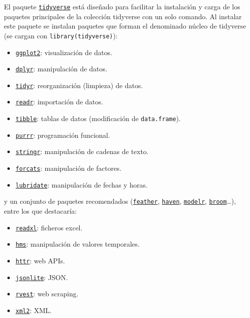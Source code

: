 \documentclass[
]{book}
\providecommand{\tightlist}{%
  \setlength{\itemsep}{0pt}\setlength{\parskip}{0pt}}
\theoremstyle{break}
\theoremstyle{nonumberplain}
\begin{document}
El paquete \href{https://tidyverse.tidyverse.org}{\texttt{tidyverse}} está diseñado para facilitar la instalación y carga de los paquetes principales de la colección tidyverse con un solo comando.
Al instalar este paquete se instalan paquetes que forman el denominado núcleo de tidyverse (se cargan con \texttt{library(tidyverse)}):

\begin{itemize}
\tightlist
\item
  \href{https://ggplot2.tidyverse.org}{\texttt{ggplot2}}: visualización de datos.
\item
  \href{https://dplyr.tidyverse.org}{\texttt{dplyr}}: manipulación de datos.
\item
  \href{https://tidyr.tidyverse.org}{\texttt{tidyr}}: reorganización (limpieza) de datos.
\item
  \href{https://readr.tidyverse.org}{\texttt{readr}}: importación de datos.
\item
  \href{https://tibble.tidyverse.org}{\texttt{tibble}}: tablas de datos (modificación de \texttt{data.frame}).
\item
  \href{https://purrr.tidyverse.org}{\texttt{purrr}}: programación funcional.
\item
  \href{https://github.com/tidyverse/stringr}{\texttt{stringr}}: manipulación de cadenas de texto.
\item
  \href{https://github.com/tidyverse/forcats}{\texttt{forcats}}: manipulación de factores.
\item
  \href{https://github.com/tidyverse/lubridate}{\texttt{lubridate}}: manipulación de fechas y horas.
\end{itemize}

y un conjunto de paquetes recomendados (\href{https://github.com/wesm/feather}{\texttt{feather}}, \href{https://github.com/tidyverse/haven}{\texttt{haven}}, \href{https://github.com/tidyverse/modelr}{\texttt{modelr}}, \href{https://github.com/tidymodels/broom}{\texttt{broom}}\ldots), entre los que destacaría:

\begin{itemize}
\tightlist
\item
  \href{https://github.com/tidyverse/readxl}{\texttt{readxl}}: ficheros excel.
\item
  \href{https://github.com/tidyverse/hms}{\texttt{hms}}: manipulación de valores temporales.
\item
  \href{https://github.com/r-lib/httr}{\texttt{httr}}: web APIs.
\item
  \href{https://github.com/jeroen/jsonlite}{\texttt{jsonlite}}: JSON.
\item
  \href{https://github.com/tidyverse/rvest}{\texttt{rvest}}: web scraping.
\item
  \href{https://github.com/r-lib/xml2}{\texttt{xml2}}: XML.
\end{itemize}
\end{document}
